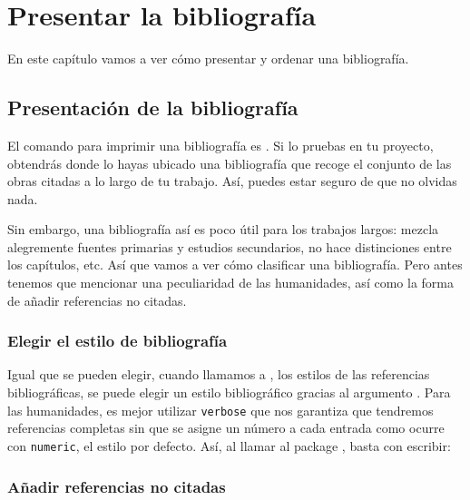\chapter{Presentar la bibliografía}

\begin{intro}

En este capítulo vamos a ver cómo presentar y ordenar una bibliografía.
\end{intro}


\section{Presentación de la bibliografía}

El comando para imprimir una bibliografía es
. Si lo pruebas en tu proyecto, obtendrás donde
lo hayas ubicado una bibliografía que recoge el conjunto de las obras
citadas a lo largo de tu trabajo. Así, puedes estar seguro de que no
olvidas nada.

Sin embargo, una bibliografía así es poco útil para los trabajos
largos: mezcla alegremente fuentes primarias y estudios secundarios,
no hace distinciones entre los capítulos, etc. Así que vamos a ver
cómo clasificar una bibliografía. Pero antes tenemos que mencionar una
peculiaridad de las humanidades, así como la forma de añadir
referencias no citadas.



\subsection{Elegir el estilo de bibliografía}

Igual que se pueden elegir, cuando llamamos a
, los estilos de las referencias bibliográficas, se
puede elegir un estilo bibliográfico gracias al argumento
. Para las humanidades, es mejor utilizar
\verb|verbose| que nos garantiza que tendremos referencias completas
sin que se asigne un número a cada entrada como ocurre con
\verb|numeric|, el estilo por defecto.  Así, al llamar al package
, basta con escribir:

\begin{latexcode}
\usepackage[bibstyle=verbose,...]{biblatex}
\end{latexcode}

\subsection{Añadir referencias no citadas}

